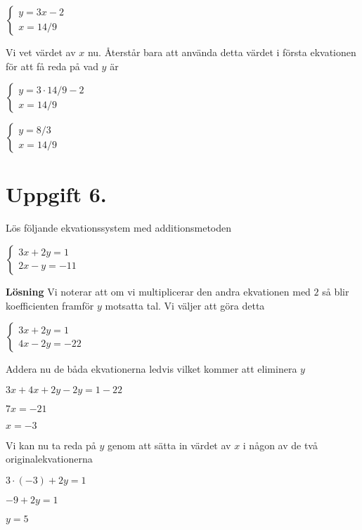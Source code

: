 \documentclass{article}
\begin{document}
$\begin{cases}
y=3x-2\\
x=14/9
\end{cases}$

Vi vet värdet av $x$ nu. Återstår bara att använda detta värdet i första ekvationen för att få reda på vad $y$ är

$\begin{cases}
y=3\cdot14/9-2\\
x=14/9
\end{cases}$

$\begin{cases}
y=8/3\\
x=14/9
\end{cases}$

\section*{Uppgift 6.}
Lös följande ekvationssystem med additionsmetoden

$\begin{cases}
3x+2y=1\\
2x-y=-11
\end{cases}$

\textbf{Lösning}
Vi noterar att om vi multiplicerar den andra ekvationen med $2$ så blir koefficienten framför $y$ motsatta tal. Vi väljer att göra detta

$\begin{cases}
3x+2y=1\\
4x-2y=-22
\end{cases}$

Addera nu de båda ekvationerna ledvis vilket kommer att eliminera $y$

$3x+4x+2y-2y=1-22$

$7x=-21$

$x=-3$

Vi kan nu ta reda på $y$ genom att sätta in värdet av $x$ i någon av de två originalekvationerna

$3\cdot(-3)+2y=1$

$-9+2y=1$

$y=5$
\end{document}

